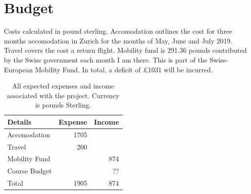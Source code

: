 \documentclass[11pt, onehalfspacing]{article}
\begin{document}
\section{Budget}
Costs calculated in pound sterling. Accomodation outlines the cost for three months accomodation in Zurich for the months of May, June and July 2019. Travel covers the cost a return flight. Mobility fund is 291.36 pounds contributed by the Swiss government each month I am there. This is part of the Swiss-European Mobility Fund. In total, a deficit of £1031 will be incurred.  

\bigskip




\begin{table}[H]
\begin{center}
	\caption{All expected expenses and income associated with the project. Currency is pounds Sterling. }
\begin{tabular}{lrr}
	\toprule
	Details      & Expense  & Income \\
	\midrule
	Accomodation    & 1705   &  \\                                                     
	Travel  & 200 & \\
	Mobility Fund  & & 874\\ 
	Course Budget  & & ??\\ 
	\hline
	Total & 1905 & 874 \\
	\bottomrule              
\end{tabular}
\end{center}
\end{table}


%
%






\end{document}
